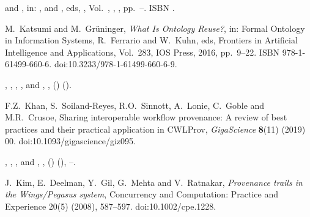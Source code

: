 \documentclass[ds,v1.1.2,openaccess]{iosart2x}%
\begin{document}
\begin{thebibliography}{}
%
\begin{bchapter}
 and
,
in: ,
 and
, eds,
,
Vol.~,
,
,
pp.~--.
ISBN .
\end{bchapter}
%
\OrigBibText
M.~Katsumi and
M.~Gr\"{u}ninger,
\textit{What Is Ontology Reuse?},
in: Formal Ontology in Information Systems,
R.~Ferrario and
W.~Kuhn, eds,
Frontiers in Artificial Intelligence and Applications,
Vol.~283,
{IOS} Press,
2016,
pp.~9--22.
ISBN 978-1-61499-660-6.
doi:10.3233/978-1-61499-660-6-9.
\endOrigBibText
{}
\endbibitem

%
\begin{barticle}
,
,
,
,
 and
,
,
()
().
\end{barticle}
%
\OrigBibText
F.Z.~Khan,
S.~Soiland-Reyes,
R.O.~Sinnott,
A.~Lonie,
C.~Goble and
M.R.~Crusoe,
Sharing interoperable workflow provenance: A review of best practices
and their
practical application in {CWLProv},
\textit{GigaScience}
\textbf{8}(11)
(2019)
00.
doi:10.1093/gigascience/giz095.
\endOrigBibText
{}
\endbibitem

%
\begin{barticle}
,
,
,
 and
,
,
()
(),
--.
\end{barticle}
%
\OrigBibText
J.~Kim,
E.~Deelman,
Y.~Gil,
G.~Mehta and
V.~Ratnakar,
\textit{Provenance trails in the Wings/Pegasus system},
Concurrency and Computation: Practice and Experience
20(5)
(2008),
587--597.
doi:10.1002/cpe.1228.
\endOrigBibText
{}
\endbibitem


\end{thebibliography}
\end{document}
